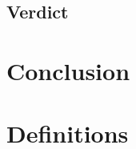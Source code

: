 \documentclass[a4paper]{article}
\begin{document}
		\subsection{Verdict}
		\label{section:verdict}


	\section{Conclusion}
	\label{section:conclusion}



	\clearpage

	\appendix

	\section{Definitions}
	\label{section:definitions}
\end{document}
